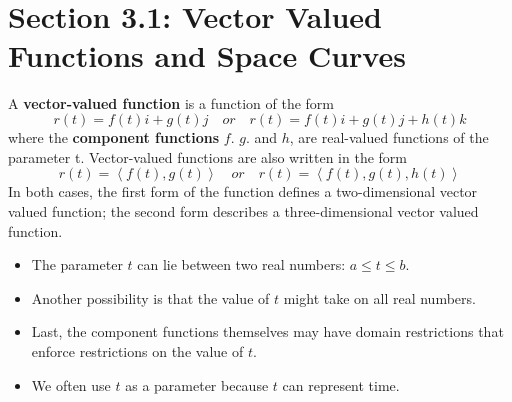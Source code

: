 \documentclass{article}
\title{
    \vspace{2in}
    \textmd{\textbf{\notesClass}}\\
    \normalsize\vspace{0.1in}\small{\notesDate}\\
    \vspace{0.1in}\large{\textit{\classInstructor}}
    \vspace{3in}
}
\author{\authorName}
\date{}
\newcommand{\newsection}[3][2]{\section{Section #2: #3}}
\begin{document}
\maketitle

\pagebreak

\newsection{3.1}{Vector Valued Functions and Space Curves}

\begin{definition}
	A \textbf{vector-valued function} is a function of the form
	$$r(t) = f(t)i + g(t)j \quad or \quad r(t) = f(t)i + g(t)j + h(t)k$$
	where the \textbf{component functions} $f$. $g$. and $h$, are real-valued functions of the parameter t. Vector-valued functions are also written in the form
	$$r(t) = \left< f(t), g(t) \right> \quad or \quad r(t) = \left< f(t), g(t), h(t) \right>$$
	In both cases, the first form of the function defines a two-dimensional vector valued function; the second form describes a three-dimensional vector valued function.
\end{definition}

\begin{itemize}
	\item The parameter $t$ can lie between two real numbers: $a \le t \le b$.
	\item Another possibility is that the value of $t$ might take on all real numbers.
	\item Last, the component functions themselves may have domain restrictions that enforce restrictions on the value of $t$.
	\item We often use $t$ as a parameter because $t$ can represent time.
\end{itemize}
\end{document}
